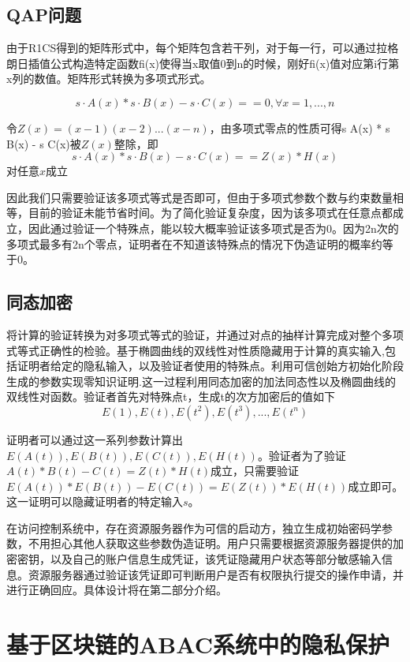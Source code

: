\subsection{QAP问题}

由于R1CS得到的矩阵形式中，每个矩阵包含若干列，对于每一行，可以通过拉格朗日插值公式构造特定函数fi(x)使得当x取值0到n的时候，刚好fi(x)值对应第i行第x列的数值。矩阵形式转换为多项式形式。

$$s \cdot A(x) * s \cdot B(x) - s \cdot C(x) == 0, \forall x = 1, ... , n$$

令$Z(x) = (x-1)(x-2)...(x-n)$，由多项式零点的性质可得s \cdot A(x) * s \cdot B(x) - s \cdot C(x)被$Z(x)$整除，即
$$s \cdot A(x) * s \cdot B(x) - s \cdot C(x) == Z(x)*H(x)$$ 对任意$x$成立

因此我们只需要验证该多项式等式是否即可，但由于多项式参数个数与约束数量相等，目前的验证未能节省时间。为了简化验证复杂度，因为该多项式在任意点都成立，因此通过验证一个特殊点，能以较大概率验证该多项式是否为0。因为2n次的多项式最多有2n个零点，证明者在不知道该特殊点的情况下伪造证明的概率约等于0。

\subsection{同态加密}

将计算的验证转换为对多项式等式的验证，并通过对点的抽样计算完成对整个多项式等式正确性的检验。基于椭圆曲线的双线性对性质隐藏用于计算的真实输入,包括证明者给定的隐私输入，以及验证者使用的特殊点。利用可信创始方初始化阶段生成的参数实现零知识证明.这一过程利用同态加密的加法同态性以及椭圆曲线的双线性对函数。验证者首先对特殊点t，生成t的次方加密后的值如下
$$E(1),E(t), E(t^2), E(t^3),..., E(t^n)$$

证明者可以通过这一系列参数计算出$E(A(t)),E(B(t)),E(C(t)),E(H(t))$。验证者为了验证$A(t)*B(t)-C(t) = Z(t)*H(t)$成立，只需要验证$E(A(t))*E(B(t))-E(C(t)) = E(Z(t))*E(H(t))$成立即可。这一证明可以隐藏证明者的特定输入$s$。

在访问控制系统中，存在资源服务器作为可信的启动方，独立生成初始密码学参数，不用担心其他人获取这些参数伪造证明。用户只需要根据资源服务器提供的加密密钥，以及自己的账户信息生成凭证，该凭证隐藏用户状态等部分敏感输入信息。资源服务器通过验证该凭证即可判断用户是否有权限执行提交的操作申请，并进行正确回应。具体设计将在第二部分介绍。

\section{基于区块链的ABAC系统中的隐私保护}

